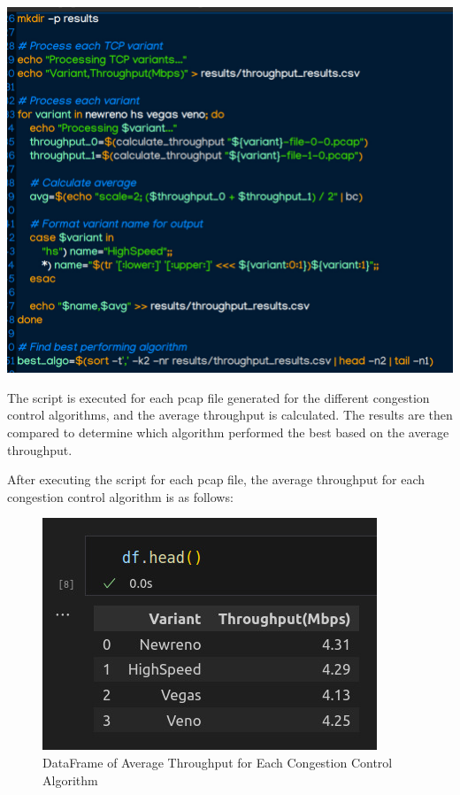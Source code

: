 \documentclass[11pt,a4paper]{article}
\begin{document}
\begin{center}
    \includegraphics[width=1\columnwidth]{images/throughput_calculation2.jpg}
\end{center}
The script is executed for each pcap file generated for the different congestion control algorithms, and the average throughput is calculated.
The results are then compared to determine which algorithm performed the best based on the average throughput.

After executing the script for each pcap file, the average throughput for each congestion control algorithm is as follows:
\begin{figure}[h]
    \centering
    \includegraphics[width=0.9\columnwidth]{images/throughput_df.jpg}
    \caption{DataFrame of Average Throughput for Each Congestion Control Algorithm}
\end{figure}
\end{document}
